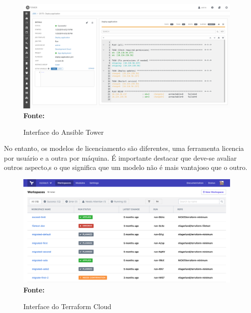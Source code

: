 \begin{figure}[H]
	\centering	
	\caption[\hspace{0.1cm} Interface do Ansible Tower]{ Interface do Ansible Tower}
	\vspace{-0.4cm}
	\includegraphics[width=1.0\textwidth]{artigo/figuras/RH-Ansible-Tower-job-details.png}
	 \vspace{-0.2cm}
	\\\textbf{\footnotesize Fonte: \cite{ansible_tower}}
	\label{fig:figura13}
\end{figure}
\vspace{-0.5cm}

No entanto, os modelos de licenciamento são diferentes, uma ferramenta licencia por usuário e a outra  por máquina. É importante destacar que deve-se avaliar outros aspecto,s o que significa que um modelo não é mais vantajoso que o outro. 

\begin{figure}[H]
	\centering	
	\caption[\hspace{0.1cm} Interface do Terraform Cloud]{ Interface do Terraform Cloud}
	\vspace{-0.4cm}
	\includegraphics[width=1.0\textwidth]{artigo/figuras/terraform_cloud.png}
	 \vspace{-0.2cm}
	\\\textbf{\footnotesize Fonte: \cite{terraform_cloud}}
	\label{fig:figura14}
\end{figure}
\vspace{-0.5cm}

